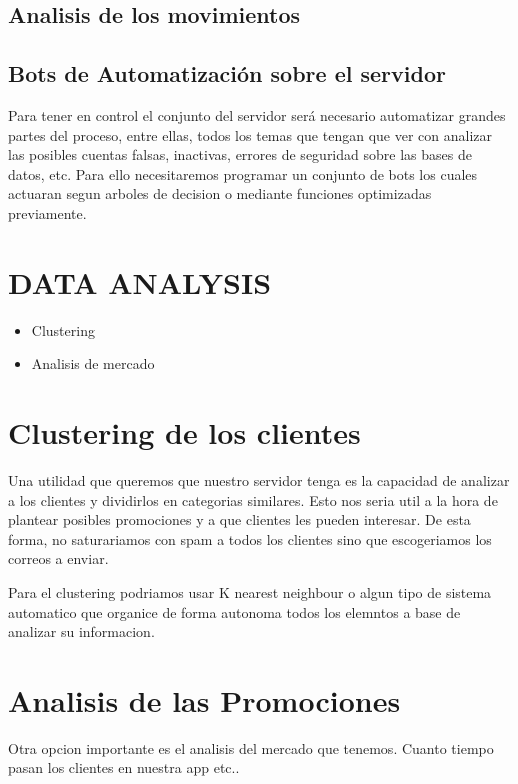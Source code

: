 \documentclass{article}
\theoremstyle{definition}
\begin{document}
\subsection{Analisis de los movimientos}

\subsection{Bots de Automatización sobre el servidor}

Para tener en control el conjunto del servidor será necesario automatizar grandes partes del proceso, entre ellas, todos los temas que tengan que ver con analizar las posibles cuentas falsas, inactivas, errores de seguridad sobre las bases de datos, etc. Para ello necesitaremos programar un conjunto de bots los cuales actuaran segun arboles de decision o mediante funciones optimizadas previamente.

\section{DATA ANALYSIS}

\begin{itemize}
    \item Clustering
    \item Analisis de mercado
\end{itemize}

\section{Clustering de los clientes}

Una utilidad que queremos que nuestro servidor tenga es la capacidad de analizar a los clientes y dividirlos en categorias similares. Esto nos seria util a la hora de plantear posibles promociones y a que clientes les pueden interesar. De esta forma, no saturariamos con spam a todos los clientes sino que escogeriamos los correos a enviar. 

Para el clustering podriamos usar K nearest neighbour o algun tipo de sistema automatico que organice de forma autonoma todos los elemntos a base de analizar su informacion.

\section{Analisis de las Promociones}

Otra opcion importante es el analisis del mercado que tenemos. Cuanto tiempo pasan los clientes en nuestra app etc..
\end{document}
